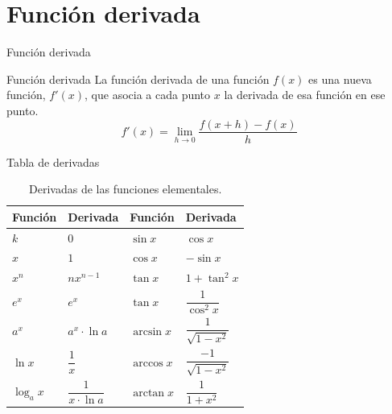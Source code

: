 \documentclass[8pt]{beamer}
\begin{document}
\section{Función derivada}
\begin{frame}[t]{Función derivada}
\begin{alertblock}{Función derivada}
La función derivada de una función $f(x)$ es una nueva función, $f'(x)$, que asocia a cada punto $x$ la derivada de esa función en ese punto.
\[
 f'(x)=\lim_{h \to 0} \dfrac{f(x+h)-f(x)}{h} 
\]
\end{alertblock}
\end{frame}
\begin{frame}{Tabla de derivadas}

\setlength{\arrayrulewidth}{0.2mm}
\setlength{\tabcolsep}{10pt}
\renewcommand{\arraystretch}{2}


\begin{table}[H]
\begin{center}
\begin{tabular}{|p{1.2cm}|p{1.2cm}|p{1.2cm}|p{1.2cm}|}

\hline
 \textbf{Función} & \textbf{Derivada} & \textbf{Función} & \textbf{Derivada}\\
 \hline
	 $k$ & $0 $ & $\sin x$ & $ \cos x$ \\
\rowcolor{verdep}	 $x $ & $1 $ & $ \cos x$ & $ -\sin x$\\
	 $x^n $ & $n x^{n-1} $ & $ \tan x$ & $ 1+\tan^2 x $\\
\rowcolor{verdep}	 $ e^x $ & $ e^x$ & $ \tan x$ & $\dfrac{1}{\cos^2 x} $\\
	 $ a^x$ & $ a^x \cdot \ln a$ & $ \arcsin x$ & $ \dfrac{1}{\sqrt{1-x^2}}$ \\
\rowcolor{verdep}	 $ \ln x$ & $\dfrac{1}{x} $ & $ \arccos x$ & $ \dfrac{-1}{\sqrt{1-x^2}}$\\
	 $ \log_ a x$ & $ \dfrac{1}{x \cdot \ln a}$ &  $ \arctan x$ & $ \dfrac{1}{1+x^2}$ \\
\hline
\end{tabular}
\caption{\label{tab:tabla-derivadas}Derivadas de las funciones elementales.}
\end{center}
\end{table}


\end{frame}
\end{document}

